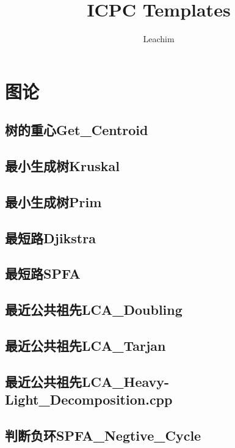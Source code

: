 \documentclass[10pt,a4paper]{article}
\begin{document}
\title{ICPC Templates}
\author {Leachim}
\maketitle
\tableofcontents

\newpage
\section{图论}
\subsection{树的重心Get\_Centroid}

\subsection{最小生成树Kruskal}

\subsection{最小生成树Prim}

\subsection{最短路Djikstra}

\subsection{最短路SPFA}

\subsection{最近公共祖先LCA\_Doubling}

\subsection{最近公共祖先LCA\_Tarjan}

\subsection{最近公共祖先LCA\_Heavy-Light\_Decomposition.cpp}

\subsection{判断负环SPFA\_Negtive\_Cycle}

\end{document}

